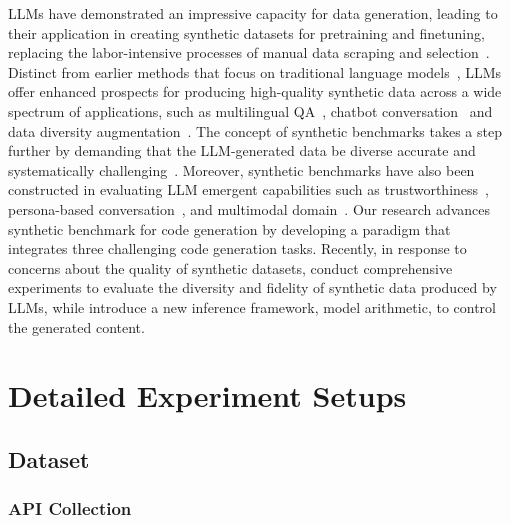 
 LLMs have demonstrated an impressive capacity for data generation, leading to their application in creating synthetic datasets for pretraining and finetuning, replacing the labor-intensive processes of manual data scraping and selection~\citep{liu2024best}.
Distinct from earlier methods that focus on traditional language models~\citep{schick2021generating}, LLMs offer enhanced prospects for producing high-quality synthetic data across a wide spectrum of applications, such as multilingual QA~\citep{riabi-etal-2021-synthetic}, chatbot conversation~\citep{zhao2023inthe,zhang-etal-2024-llm} and data diversity augmentation~\citep{dai2025auggpt,chung2023increasing,chen2024interleaved}. 
The concept of synthetic benchmarks takes a step further by demanding that the LLM-generated data be diverse accurate and systematically challenging~\citep{chen2025guiworld,wu2024unigen}. Moreover, synthetic benchmarks have also been constructed in evaluating LLM emergent capabilities such as trustworthiness~\citep{huang2024trustllm, ye2024justice,gao2024best}, persona-based conversation~\citep{jandaghi2023faithful}, and multimodal domain~\citep{zhang2024task,bao2024autobench,chen2024mllm}. Our research advances synthetic benchmark for code generation by developing a paradigm that integrates three challenging code generation tasks. Recently, in response to concerns about the quality of synthetic datasets, \citet{dekoninck2024understanding} conduct comprehensive experiments to evaluate the diversity and fidelity of synthetic data produced by LLMs, while \citet{dekoninck2024controlled} introduce a new inference framework, model arithmetic, to control the generated content.

\section{Detailed Experiment Setups}
\subsection{Dataset}
\subsubsection{API Collection}
\label{appx_api_collection}

